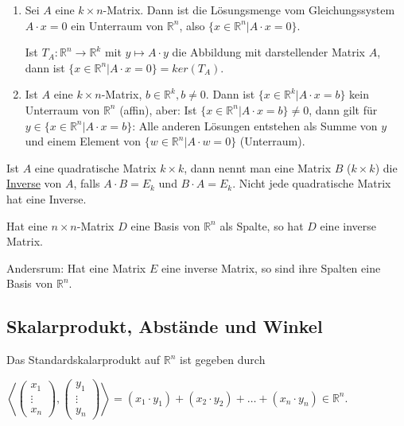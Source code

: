 \documentclass{mg2}
\begin{document}
\begin{proposition}
\begin{enumerate}
\item Sei $A$ eine $k \times n$-Matrix. Dann ist die Lösungsmenge vom Gleichungssystem $A \cdot x = 0$ ein Unterraum von $\mathbb{R}^n$, also $\{ x \in \mathbb{R}^n | A \cdot x = 0 \}$.

Ist $T_A : \mathbb{R}^n \to \mathbb{R}^k$ mit $y \mapsto A \cdot y$ die Abbildung mit darstellender Matrix $A$, dann ist $\{x \in \mathbb{R}^n | A \cdot x = 0\} = ker(T_A)$.
\item Ist $A$ eine $k \times n$-Matrix, $b \in \mathbb{R}^k, b \neq 0$. Dann ist $\{ x \in \mathbb{R}^k | A \cdot x = b \}$ kein Unterraum von $\mathbb{R}^n$ (affin), aber: Ist $\{x \in \mathbb{R}^n | A \cdot x = b \} \neq 0$, dann gilt für $y \in \{x \in \mathbb{R}^n | A \cdot x = b\}$: Alle anderen Lösungen entstehen als Summe von $y$ und einem Element von $\{w \in \mathbb{R}^n | A \cdot w = 0\}$ (Unterraum).
\end{enumerate}
\end{proposition}

\begin{definition}[Inverse]
Ist $A$ eine quadratische Matrix $k \times k$, dann nennt man eine Matrix $B$ ($k \times k$) die \underline{Inverse} von $A$, falls $A \cdot B = E_k$ und $B \cdot A = E_k$. Nicht jede quadratische Matrix hat eine Inverse.
\end{definition}

\begin{satz}
Hat eine $n \times n$-Matrix $D$ eine Basis von $\mathbb{R}^n$ als Spalte, so hat $D$ eine inverse Matrix.
\end{satz}
Andersrum: Hat eine Matrix $E$ eine inverse Matrix, so sind ihre Spalten eine Basis von $\mathbb{R}^n$.


\subsection{Skalarprodukt, Abstände und Winkel}

\begin{definition}[Skalarprodukt]
Das Standardskalarprodukt auf $\mathbb{R}^n$ ist gegeben durch 

$\left\langle \begin{pmatrix}x_1\\\vdots\\x_n\end{pmatrix},\begin{pmatrix}y_1\\\vdots\\y_n\end{pmatrix} \right\rangle = (x_1\cdot y_1) + (x_2\cdot y_2) + \dots + (x_n\cdot y_n) \in \mathbb{R}^n$.
\end{definition}
\end{document}
